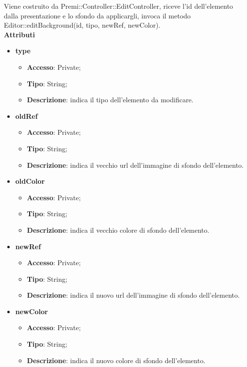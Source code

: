 {{{		\indent Viene costruito da Premi::Controller::EditController, riceve l’id dell’elemento dalla presentazione e lo sfondo da applicargli, invoca il metodo Editor::editBackground(id, tipo, newRef, newColor).\\
	\textbf{Attributi}
	\begin{itemize}
		\item \textbf{type}
		\begin{itemize}
			\item \textbf{Accesso}: Private;
			\item \textbf{Tipo}: String;
			\item \textbf{Descrizione}: indica il tipo dell’elemento da modificare.
		\end{itemize}
		\item \textbf{oldRef}
		\begin{itemize}
			\item \textbf{Accesso}: Private;
			\item \textbf{Tipo}: String;
			\item \textbf{Descrizione}: indica il vecchio url dell’immagine di sfondo dell’elemento.
		\end{itemize}
		\item \textbf{oldColor}
		\begin{itemize}
			\item \textbf{Accesso}: Private;
			\item \textbf{Tipo}: String;
			\item \textbf{Descrizione}: indica il vecchio colore di sfondo dell’elemento.
		\end{itemize}
		\item \textbf{newRef}
		\begin{itemize}
			\item \textbf{Accesso}: Private;
			\item \textbf{Tipo}: String;
			\item \textbf{Descrizione}: indica il nuovo url dell’immagine di sfondo dell’elemento.
		\end{itemize}
		\item \textbf{newColor}
		\begin{itemize}
			\item \textbf{Accesso}: Private;
			\item \textbf{Tipo}: String;
			\item \textbf{Descrizione}: indica il nuovo colore di sfondo dell’elemento.
		\end{itemize}
	\end{itemize}
	
}}}
